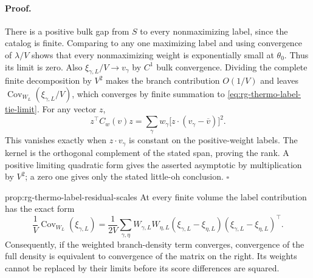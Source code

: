 \paragraph{Proof.}
There is a positive bulk gap from $S$ to every nonmaximizing label,
since the catalog is finite. Comparing to any one maximizing label and
using convergence of $\lambda/V$ shows that every nonmaximizing weight
is exponentially small at $\theta_0$. Thus its limit is zero. Also
$\xi_{\gamma,L}/V\to v_\gamma$ by $C^1$ bulk convergence. Dividing the
complete finite decomposition by $V^2$ makes the branch contribution
$O(1/V)$ and leaves
$\operatorname{Cov}_{W_L}(\xi_{\gamma,L}/V)$, which converges by finite
summation to \cref{eq:rg-thermo-label-tie-limit}. For any vector $z$,
\begin{equation}
 z^\top C_w(v)z
 =\sum_\gamma w_\gamma
       \big[z\cdot(v_\gamma-\overline v)\big]^2.
 \label{eq:rg-thermo-label-tie-direction}
\end{equation}
This vanishes exactly when $z\cdot v_\gamma$ is constant on the
positive-weight labels. The kernel is the orthogonal complement of
the stated span, proving the rank. A positive limiting quadratic form
gives the asserted asymptotic by multiplication by $V^2$; a zero one
gives only the stated little-oh conclusion. $\square$

{prop:rg-thermo-label-residual-scales}
At every finite volume the label contribution has the exact form
\begin{equation}
 \frac1V\operatorname{Cov}_{W_L}(\xi_{\gamma,L})
 =\frac1{2V}\sum_{\gamma,\eta}W_{\gamma,L}W_{\eta,L}
   (\xi_{\gamma,L}-\xi_{\eta,L})
   (\xi_{\gamma,L}-\xi_{\eta,L})^\top.
 \label{eq:rg-thermo-label-pairwise-covariance}
\end{equation}
Consequently, if the weighted branch-density term converges, convergence
of the full density is equivalent to convergence of the matrix on the
right. Its weights cannot be replaced by their limits before its
score differences are squared.

